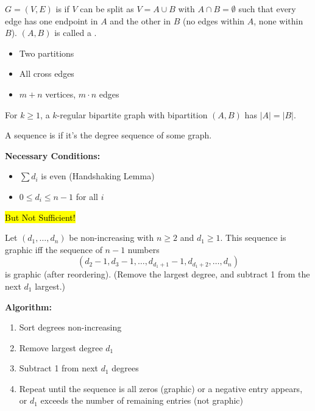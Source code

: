 \documentclass[8pt,a4paper,landscape]{extarticle}
\begin{document}
\begin{cscolumns}
\begin{definition}[Bipartite]
$G=(V,E)$ is  if $V$ can be split as $V=A\cup B$ with $A\cap B=\emptyset$ such that every edge has one endpoint in $A$ and the other in $B$ (no edges within $A$, none within $B$). $(A,B)$ is called a .
\end{definition}
\begin{definition}
\begin{itemize}
\item Two partitions
\item All cross edges
\item $m+n$ vertices, $m\cdot n$ edges
\end{itemize}
\end{definition}
\begin{theorem}
For $k\ge 1$, a $k$-regular bipartite graph with bipartition $(A,B)$ has $|A|=|B|$.
\end{theorem}

\columnbreak
{}
\begin{definition}[Graphic]
A sequence is  if it's the degree sequence of some graph.
\end{definition}
\textbf{Necessary Conditions:}
\begin{itemize}
\item $\sum d_i$ is even (Handshaking Lemma)
\item $0\le d_i\le n-1$ for all $i$
\end{itemize}
\hl{But Not Sufficient!}

\begin{theorem}
Let $(d_1,\dots,d_n)$ be non-increasing with $n\ge 2$ and $d_1\ge 1$. This sequence is graphic iff the sequence of $n-1$ numbers
\[ (d_2-1,d_3-1,\dots,d_{d_1+1}-1,d_{d_1+2},\dots,d_n) \]
is graphic (after reordering). (Remove the largest degree, and subtract 1 from the next $d_1$ largest.)

\textbf{Algorithm:}
\begin{enumerate}[label=\arabic*.]
\item Sort degrees non-increasing
\item Remove largest degree $d_1$
\item Subtract 1 from next $d_1$ degrees
\item Repeat until the sequence is all zeros (graphic) or a negative entry appears, or $d_1$ exceeds the number of remaining entries (not graphic)
\end{enumerate}
\end{theorem}


\end{cscolumns}
\end{document}
